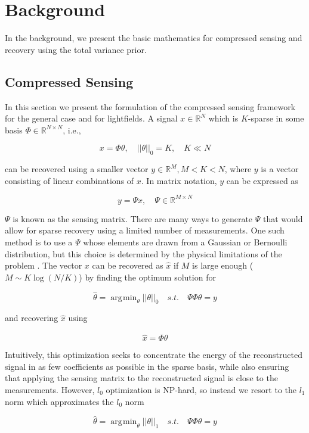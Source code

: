 \documentclass[10pt,twocolumn,letterpaper]{article}
\DeclareMathOperator*{\argmin}{\arg\!\min}
\begin{document}
\section{Background}

In the background, we present the basic mathematics for compressed sensing and recovery using the total variance prior.

\subsection{Compressed Sensing}

In this section we present the formulation of the compressed sensing framework \cite{CSPaper} for the general case and for lightfields. A signal $x \in \mathbb{R}^N$ which is $K$-sparse in some basis $\Phi \in \mathbb{R}^{N\times N}$, i.e.,

\[ x = \Phi \theta, \quad ||\theta||_0 = K, \quad K \ll N\]

can be recovered using a smaller vector $y \in \mathbb{R}^M, M < K < N$, where $y$ is a vector consisting of linear combinations of $x$. In matrix notation, $y$ can be expressed as 

\[ y = \Psi x, \quad \Psi \in \mathbb{R}^{M \times N}\]

$\Psi$ is known as the sensing matrix. There are many ways to generate $\Psi$ that would allow for sparse recovery using a limited number of measurements. One such method is to use a $\Psi$ whose elements are drawn from a Gaussian or Bernoulli distribution, but this choice is determined by the physical limitations of the problem \cite{Rauhut11}. The vector $x$ can be recovered as $\hat{x}$ if $M$ is large enough ($M \sim K\log(N/K)$) by finding the optimum solution for 

\[ \hat{\theta} = \argmin_\theta ||\theta||_0 \quad s.t. \quad \Psi\Phi\theta = y\]

and recovering $\hat{x}$ using

\[ \hat{x} = \Phi \hat{\theta}\]

Intuitively, this optimization seeks to concentrate the energy of the reconstructed signal in as few coefficients as possible in the sparse basis, while also ensuring that applying the sensing matrix to the reconstructed signal is close to the measurements. However, $l_0$ optimization is NP-hard, so instead we resort to the $l_1$ norm which approximates the $l_0$ norm

\[ \hat{\theta} = \argmin_\theta ||\theta||_1 \quad s.t. \quad \Psi\Phi\theta = y\]
\end{document}
